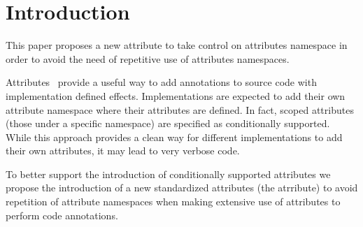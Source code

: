 \section{Introduction}

This paper proposes a new attribute to take control on attributes namespace
in order to avoid the need of repetitive use of attributes namespaces.

Attributes~\cite{n2761} provide a useful way to add annotations to source code with
implementation defined effects. Implementations are expected to add their
own attribute namespace where their attributes are defined. In fact,
scoped attributes (those under a specific namespace) are specified
as conditionally supported. While this approach
provides a clean way for different implementations to add their own attributes,
it may lead to very verbose code.

To better support the introduction of conditionally supported attributes we
propose the introduction of a new standardized attributes (the  atrribute)
to avoid repetition of attribute namespaces when making extensive use
of attributes to perform code annotations.
